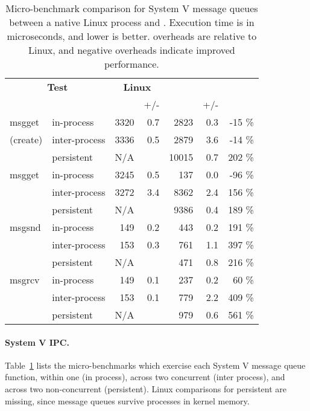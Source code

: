 \begin{table}[t!b!]
\footnotesize
\centering
\begin{tabular}{|ll|rr|rrr|}
\hline
\multicolumn{2}{|c|}{{\bf Test}} &
\multicolumn{2}{c|}{{\bf Linux}} &
\multicolumn{3}{c|}{{\bf \graphene{}}} \\
 & & \us{} & +/- & \us{} & +/- & \\
\hline
msgget   & in-process    & 3320	& 0.7 &  2823 & 0.3 &	-15	\%		\\
(create) & inter-process & 3336	& 0.5 &  2879 & 3.6 &	-14	\%		\\
         & persistent    &  N/A	&     & 10015 & 0.7 &	202	\%      \\
\hline								
msgget   & in-process    & 3245	& 0.5 &   137 & 0.0 &	-96	\%		\\
         & inter-process & 3272	& 3.4 &  8362 & 2.4 &	156	\%		\\
         & persistent    &  N/A	&     &  9386 & 0.4 &	189	\%      \\
\hline								
msgsnd   & in-process    &  149	& 0.2 &   443 & 0.2 &	191	\%		\\
         & inter-process &  153	& 0.3 &   761 & 1.1 &	397	\%		\\
         & persistent    &  N/A	&     &   471 & 0.8 &	216	\%	    \\
\hline								
msgrcv   & in-process    &  149	& 0.1 &   237 & 0.2 &	60	\%		\\
         & inter-process &  153	& 0.1 &   779 & 2.2 &	409	\%  	\\
         & persistent    &  N/A	&     &   979 & 0.6 &	561	\%	    \\
         \hline
\end{tabular}
\caption[The micro-benchmark results for System V message queues in Linux, KVM, and \graphene{}]
{Micro-benchmark comparison for System V message queues
between a native Linux process and \graphene{} \picoprocs{}.
Execution time is in microseconds, and lower is better.
overheads are relative to Linux, and negative overheads indicate improved performance.}
\label{tab:graphene:msgq}
\end{table}

\paragraph{System V IPC.}
Table~\ref{tab:graphene:msgq} lists the micro-benchmarks
which exercise each System V message queue function,
within one \picoproc{} (in process), across two concurrent \picoprocs{} (inter process),
and across two non-concurrent \picoprocs{} (persistent).
Linux comparisons for persistent are missing, since message queues 
survive processes in kernel memory.

